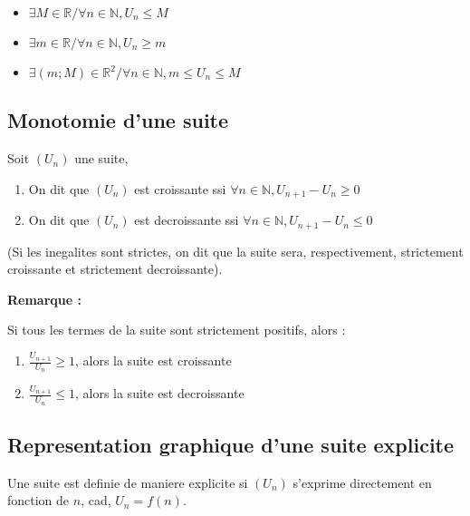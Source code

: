 \documentclass[a4paper,10pt]{book}
\begin{document}
	\begin{itemize}
		\item $\exists M \in \mathbb{R} / \forall n \in \mathbb{N} , U_n \leq M$
		\item $\exists m \in \mathbb{R} / \forall n \in \mathbb{N} , U_n \geq m$
		\item $\exists (m;M) \in \mathbb{R}^2 / \forall n \in \mathbb{N} , m \leq U_n \leq M$
	\end{itemize}

	\subsection{Monotomie d'une suite}
	\label{sub:Monotomie d'une suite}

	\begin{Def}
		Soit $(U_n)$ une suite,\\
		\begin{enumerate}
			\item On dit que $(U_n)$ est croissante ssi $\forall n \in \mathbb{N}, U_{n+1} - U_n \geq 0$
			\item On dit que $(U_n)$ est decroissante ssi $\forall n \in \mathbb{N}, U_{n+1} - U_n \leq 0$
		\end{enumerate}
		(Si les inegalites sont strictes, on dit que la suite sera, respectivement, strictement croissante et strictement decroissante).
	\end{Def}

	\textbf{Remarque : }

	Si tous les termes de la suite sont strictement positifs, alors :\\
	\begin{enumerate}
		\item $\frac{U_{n+1}}{U_n} \geq 1$, alors la suite est croissante
		\item $\frac{U_{n+1}}{U_n} \leq 1$, alors la suite est decroissante
	\end{enumerate}

	\subsection{Representation graphique d'une suite explicite}
	\label{sub:Representation graphique d'une suite explicite}

	\begin{Def}
		Une suite est definie de maniere explicite si $(U_n)$ s'exprime directement en fonction de $n$, cad, $U_n = f(n)$.
	\end{Def}
\end{document}
